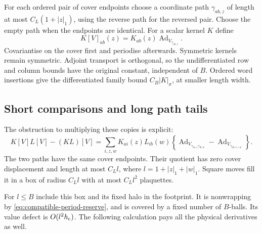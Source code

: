 \documentclass[11pt,reqno]{amsart}
\numberwithin{equation}{section}
\theoremstyle{definition}
\theoremstyle{remark}
\begin{document}
For each ordered pair of cover endpoints
choose a coordinate path \(\gamma_{ab,z}\)
of length at most \(C_L(1+|z|_1)\), using the
reverse path for the reversed pair.
Choose the empty path when the endpoints
are identical.
For a scalar kernel \(K\) define
\begin{equation}
               K[V]_{ab}(z)
                    =K_{ab}(z)
                          \operatorname{Ad}_{V_{\gamma_{ab,z}}}.
 \label{eq:compatible-covariant-copy}
\end{equation}
Covariantise on the cover first and periodise
afterwards. Symmetric kernels remain symmetric.
Adjoint transport is orthogonal, so the
undifferentiated row and column bounds have
the original constant, independent of \(B\).
Ordered word insertions give the differentiated
family bound \(C_B|K|_\sigma\), at smaller
length width.

\subsection{Short comparisons and long path tails}

The obstruction to multiplying these copies
is explicit:
\[
 K[V]L[V]-(KL)[V]
  =\sum_{i,z,w}K_{ai}(z)L_{ib}(w)
       \left\{\operatorname{Ad}_{V_{\gamma_{ai,z}\gamma_{ib,w}}}
                 -\operatorname{Ad}_{V_{\gamma_{ab,z+w}}}\right\}.
\]
The two paths have the same cover endpoints.
Their quotient has zero cover displacement
and length at most \(C_Ll\), where
\(l=1+|z|_1+|w|_1\).
Square moves fill it in a box of radius
\(C_Ll\) with at most \(C_Ll^2\) plaquettes.

For \(l\le B\) include this box and its fixed
halo in the footprint.
It is nonwrapping by
\eqref{eq:compatible-period-reserve}, and is
covered by a fixed number of \(B\)-balls.
Its value defect is \(O(l^2h_{\rm c})\).
The following calculation pays all the
physical derivatives as well.
\end{document}
